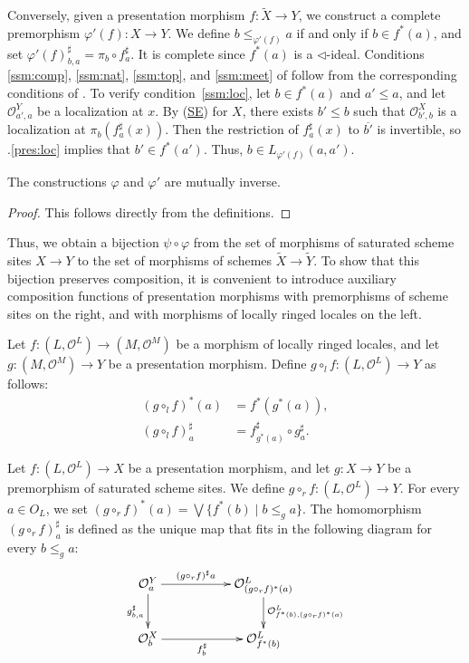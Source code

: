 \documentclass[reqno]{amsart}
\newcommand{\axref}[1]{(\hyperref[ax:#1]{#1})}
\theoremstyle{definition}
\theoremstyle{remark}
\numberwithin{figure}{section}
\newcommand{\cover}{\triangleleft}
\begin{document}
Conversely, given a presentation morphism $f : \widetilde{X} \to Y$, we construct a complete premorphism $\varphi'(f) : X \to Y$.
We define $b \leq_{\varphi'(f)} a$ if and only if $b \in f^*(a)$, and set $\varphi'(f)^\sharp_{b,a} = \pi_b \circ f^\sharp_a$.
It is complete since $f^*(a)$ is a $\cover$-ideal.
Conditions \eqref{ssm:comp}, \eqref{ssm:nat}, \eqref{ssm:top}, and \eqref{ssm:meet} of  follow from the corresponding conditions of .
To verify condition~\eqref{ssm:loc}, let $b \in f^*(a)$ and $a' \leq a$, and let $\mathcal{O}^Y_{a',a}$ be a localization at $x$.
By \axref{SE} for $X$, there exists $b' \leq b$ such that $\mathcal{O}^X_{b',b}$ is a localization at $\pi_b(f^\sharp_a(x))$.
Then the restriction of $f^\sharp_a(x)$ to $\overline{b'}$ is invertible, so .\eqref{pres:loc} implies that $b' \in f^*(a')$.
Thus, $b \in L_{\varphi'(f)}(a,a')$.

\begin{lem}
The constructions $\varphi$ and $\varphi'$ are mutually inverse.
\end{lem}
\begin{proof}
This follows directly from the definitions.
\end{proof}

Thus, we obtain a bijection $\psi \circ \varphi$ from the set of morphisms of saturated scheme sites $X \to Y$ to the set of morphisms of schemes $\widetilde{X} \to \widetilde{Y}$.
To show that this bijection preserves composition, it is convenient to introduce auxiliary composition functions of presentation morphisms with premorphisms of scheme sites on the right, and with morphisms of locally ringed locales on the left.

Let $f : (L,\mathcal{O}^L) \to (M,\mathcal{O}^M)$ be a morphism of locally ringed locales, and let $g : (M,\mathcal{O}^M) \to Y$ be a presentation morphism.
Define $g \circ_l f : (L,\mathcal{O}^L) \to Y$ as follows:
\begin{align*}
(g \circ_l f)^*(a) & = f^*(g^*(a)), \\
(g \circ_l f)^\sharp_a & = f^\sharp_{g^*(a)} \circ g^\sharp_a.
\end{align*}

Let $f : (L,\mathcal{O}^L) \to X$ be a presentation morphism, and let $g : X \to Y$ be a premorphism of saturated scheme sites.
We define $g \circ_r f : (L,\mathcal{O}^L) \to Y$.
For every $a \in O_L$, we set
$(g \circ_r f)^*(a) = \bigvee \{ f^*(b) \mid b \leq_g a \}$.
The homomorphism $(g \circ_r f)^\sharp_a$ is defined as the unique map that fits in the following diagram for every $b \leq_g a$:
\[ \xymatrix{ \mathcal{O}^Y_a \ar[rr]^-{(g \circ_r f)^\sharp a} \ar[d]_{g^\sharp_{b,a}} & & \mathcal{O}^L_{(g \circ_r f)^*(a)} \ar[d]^{\mathcal{O}^L_{f^*(b),(g \circ_r f)^*(a)}} \\
              \mathcal{O}^X_b \ar[rr]_-{f^\sharp_b}                                     & & \mathcal{O}^L_{f^*(b)}
            } \]
\end{document}

